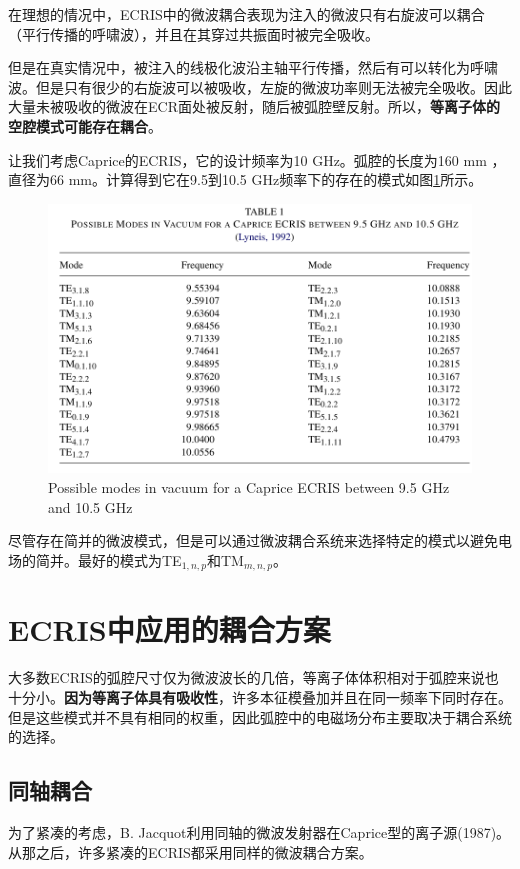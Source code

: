 \documentclass[fontset=windows]{article}
\begin{document}
在理想的情况中，ECRIS中的微波耦合表现为注入的微波只有右旋波可以耦合（平行传播的呼啸波），并且在其穿过共振面时被完全吸收。

但是在真实情况中，被注入的线极化波沿主轴平行传播，然后有可以转化为呼啸波。但是只有很少的右旋波可以被吸收，左旋的微波功率则无法被完全吸收。因此大量未被吸收的微波在ECR面处被反射，随后被弧腔壁反射。所以，\textbf{等离子体的空腔模式可能存在耦合}。

让我们考虑Caprice的ECRIS，它的设计频率为10 GHz。弧腔的长度为160 mm ，直径为66 mm。计算得到它在9.5到10.5 GHz频率下的存在的模式如图\ref{f-2}所示。
\begin{figure}
    \centering
    \includegraphics[width=1\textwidth]{possible modes.png}
    \caption{Possible modes in vacuum for a Caprice ECRIS between 9.5 GHz and 10.5 GHz}
    \label{f-2}
\end{figure}

尽管存在简并的微波模式，但是可以通过微波耦合系统来选择特定的模式以避免电场的简并。最好的模式为TE$_{1,n,p}$和TM$_{m,n,p}$。

\section{ECRIS中应用的耦合方案}
大多数ECRIS的弧腔尺寸仅为微波波长的几倍，等离子体体积相对于弧腔来说也十分小。\textbf{因为等离子体具有吸收性}，许多本征模叠加并且在同一频率下同时存在。但是这些模式并不具有相同的权重，因此弧腔中的电磁场分布主要取决于耦合系统的选择。

\subsection{同轴耦合}
为了紧凑的考虑，B. Jacquot利用同轴的微波发射器在Caprice型的离子源(1987)。从那之后，许多紧凑的ECRIS都采用同样的微波耦合方案。
\end{document}
